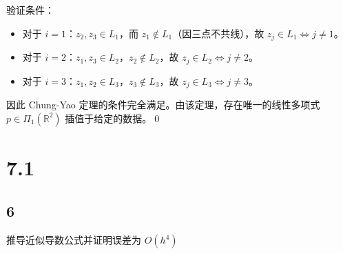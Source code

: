 \documentclass{article}
\begin{document}
  验证条件：
  \begin{itemize}
    \item 对于 \( i = 1 \)：\( z_2, z_3 \in L_1 \)，而 \( z_1 \notin L_1 \)（因三点不共线），故 \( z_j \in L_1 \iff j \neq 1 \)。
    \item 对于 \( i = 2 \)：\( z_1, z_3 \in L_2 \)，\( z_2 \notin L_2 \)，故 \( z_j \in L_2 \iff j \neq 2 \)。
    \item 对于 \( i = 3 \)：\( z_1, z_2 \in L_3 \)，\( z_3 \notin L_3 \)，故 \( z_j \in L_3 \iff j \neq 3 \)。
  \end{itemize}

  因此 Chung-Yao 定理的条件完全满足。由该定理，存在唯一的线性多项式 \( p \in \Pi_1(\mathbb{R}^2) \) 插值于给定的数据。\qed

\section*{7.1}
\subsection*{6}
推导近似导数公式并证明误差为 \(O(h^4)\)
\end{document}
